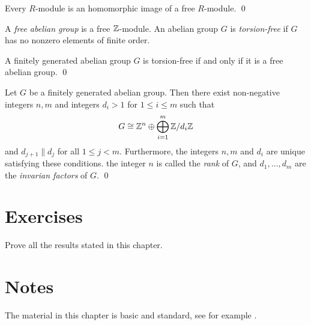 \begin{proposition}
Every $R$-module is an homomorphic image of a free $R$-module. \qed 
\end{proposition}

A {\em free abelian group} is a free $\mathbb{Z}$-module. An abelian group $G$ is {\em torsion-free} if $G$ has no nonzero elements of finite order.

\begin{proposition}
A finitely generated abelian group $G$ is torsion-free if and only if it is a free abelian group. \qed 
\end{proposition}

\begin{theorem}
Let $G$ be a finitely generated abelian group. Then there exist non-negative integers $n,m$ and integers $d_i>1$ for $1\leq i\leq m$ such that
\[ G\cong \mathbb{Z}^n\oplus \bigoplus_{i=1}^m\mathbb{Z}/d_i\mathbb{Z}\]
and $d_{j+1}\| d_j$ for all $1\leq j<m$. Furthermore, the integers $n,m$ and $d_i$ are unique satisfying these conditions. the integer $n$ is called the {\em rank} of $G$, and $d_1,\dots ,d_m$ are the {\em invarian factors} of $G$. \qed  
\end{theorem}

\section{Exercises}

\begin{prob} 
    Prove all the results stated in this chapter.
\end{prob}

\section{Notes}

The material in this chapter is basic and standard, see for example \cite{Cohn}.
